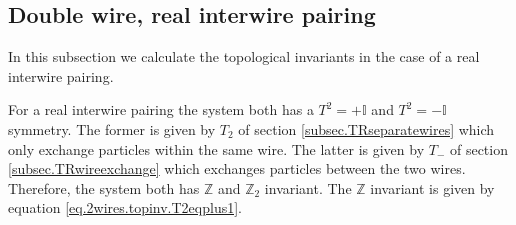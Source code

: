 \subsection{Double wire, real interwire pairing} \label{subsec.2wires_CSinv_Delta12real}
In this subsection we calculate the topological invariants in the case of a real interwire pairing. 

For a real interwire pairing the system both has a $T^2 = +\mathbb{I}$ and $T^2 = -\mathbb{I}$ symmetry. The former is given by $T_2$ of section \ref{subsec.TRseparatewires} which only exchange particles within the same wire. The latter is given by $T_-$ of section \ref{subsec.TRwireexchange} which exchanges particles between the two wires. Therefore, the system both has $\mathbb{Z}$ and $\mathbb{Z}_2$ invariant. The $\mathbb{Z}$ invariant is given by equation \eqref{eq.2wires.topinv.T2eqplus1}.

